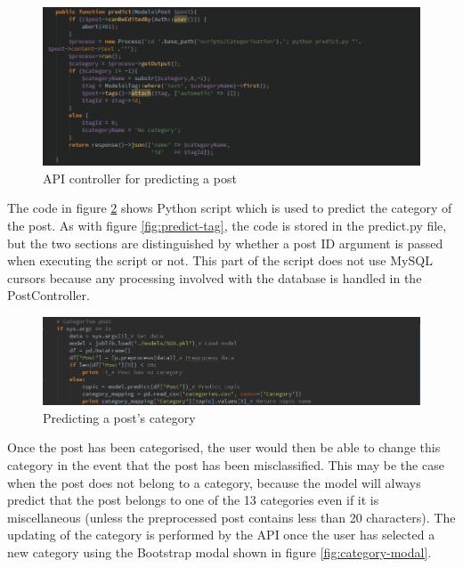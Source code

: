 \begin{figure}[H]
\centering
\includegraphics[width=\textwidth]{Images/Implementation/predict-api}
\caption{API controller for predicting a post}
\label{fig:predict-api}
\end{figure}

The code in figure \ref{fig:predict-post} shows Python script which is used to predict the category of the post. As with figure \ref{fig:predict-tag}, the code is stored in the predict.py file, but the two sections are distinguished by whether a post ID argument is passed when executing the script or not. This part of the script does not use MySQL cursors because any processing involved with the database is handled in the PostController. 

\begin{figure}[H]
\centering
\includegraphics[width=\textwidth]{Images/Implementation/predict-post}
\caption{Predicting a post's category}
\label{fig:predict-post}
\end{figure}

Once the post has been categorised, the user would then be able to change this category in the event that the post has been misclassified. This may be the case when the post does not belong to a category, because the model will always predict that the post belongs to one of the 13 categories even if it is miscellaneous (unless the preprocessed post contains less than 20 characters). The updating of the category is performed by the API once the user has selected a new category using the Bootstrap modal shown in figure \ref{fig:category-modal}. 

